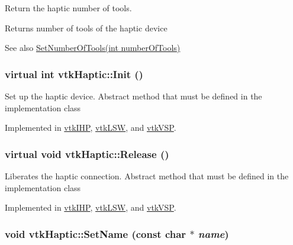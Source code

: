 Return the haptic number of tools. \begin{DoxyReturn}{Returns}
number of tools of the haptic device 
\end{DoxyReturn}
\begin{DoxySeeAlso}{See also}
\hyperlink{classvtkHaptic_a2c0be36812179261262d89ae91c31013}{SetNumberOfTools(int numberOfTools)} 
\end{DoxySeeAlso}
\hypertarget{classvtkHaptic_a164a353869ace1e3b359da03ce873066}{
\subsubsection[{Init}]{\setlength{\rightskip}{0pt plus 5cm}virtual int vtkHaptic::Init ()}}
\label{classvtkHaptic_a164a353869ace1e3b359da03ce873066}


Set up the haptic device. Abstract method that must be defined in the implementation class 

Implemented in \hyperlink{classvtkIHP_a055cc6c8150236aa3899647e32c3a0da}{vtkIHP}, \hyperlink{classvtkLSW_a9de1e9f2b2e3a2ad0e7a92b1597ab2f7}{vtkLSW}, and \hyperlink{classvtkVSP_a4b48949e4b916ebd142ef165d9e6897a}{vtkVSP}.\hypertarget{classvtkHaptic_a6bfd7e7ad232325a84ca586d92b4c3fa}{
\subsubsection[{Release}]{\setlength{\rightskip}{0pt plus 5cm}virtual void vtkHaptic::Release ()}}
\label{classvtkHaptic_a6bfd7e7ad232325a84ca586d92b4c3fa}


Liberates the haptic connection. Abstract method that must be defined in the implementation class 

Implemented in \hyperlink{classvtkIHP_a7b0ac0f3e862d015fa3f27489679aad3}{vtkIHP}, \hyperlink{classvtkLSW_a69520b1ae3e7549094ba60eb55a41cdf}{vtkLSW}, and \hyperlink{classvtkVSP_a91bfd5c41c807ab1dcbff59ff56a4d72}{vtkVSP}.\hypertarget{classvtkHaptic_a03c7815125924b8771372879ad367e09}{
\subsubsection[{SetName}]{\setlength{\rightskip}{0pt plus 5cm}void vtkHaptic::SetName (const char $\ast$ {\em name})}}
\label{classvtkHaptic_a03c7815125924b8771372879ad367e09}


